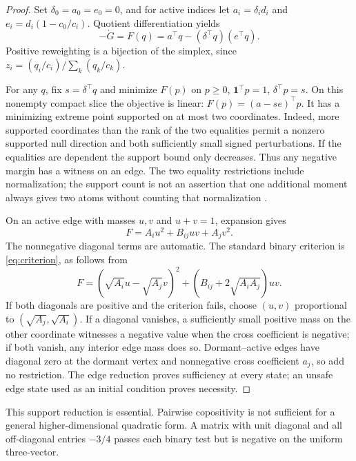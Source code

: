 \documentclass[pdflatex,sn-vancouver-num]{sn-jnl}
\theoremstyle{thmstyleone}
\begin{document}
\begin{proof}
Set $\delta_0=a_0=e_0=0$, and for active indices let
$a_i=\delta_i d_i$ and $e_i=d_i(1-c_0/c_i)$.
Quotient differentiation yields
\begin{equation}\label{eq:F}
-\dot G=F(q)=a^\top q-(\delta^\top q)(e^\top q).
\end{equation}
Positive reweighting is a bijection of the simplex, since
$z_i=(q_i/c_i)/\sum_k(q_k/c_k)$.

For any $q$, fix $s=\delta^\top q$ and minimize $F(p)$ on
$p\ge0$, $\mathbf1^\top p=1$, $\delta^\top p=s$.
On this nonempty compact slice the objective is linear:
$F(p)=(a-se)^\top p$.
It has a minimizing extreme point supported on at most two coordinates. Indeed, more supported coordinates than the rank of the two equalities permit a nonzero supported null direction and both sufficiently small signed perturbations. If the equalities are dependent the support bound only decreases. Thus any negative margin has a witness on an edge. The two equality restrictions include normalization; the support count is not an assertion that one additional moment always gives two atoms without counting that normalization \cite{moment,pinelis}.

On an active edge with masses $u,v$ and $u+v=1$, expansion gives
\begin{equation}\label{eq:binary}
F=A_i u^2+B_{ij}uv+A_jv^2.
\end{equation}
The nonnegative diagonal terms are automatic. The standard binary criterion is \eqref{eq:criterion}, as follows from
\[
F=(\sqrt{A_i}u-\sqrt{A_j}v)^2+
(B_{ij}+2\sqrt{A_iA_j})uv.
\]
If both diagonals are positive and the criterion fails, choose $(u,v)$ proportional to $(\sqrt{A_j},\sqrt{A_i})$. If a diagonal vanishes, a sufficiently small positive mass on the other coordinate witnesses a negative value when the cross coefficient is negative; if both vanish, any interior edge mass does so. Dormant--active edges have diagonal zero at the dormant vertex and nonnegative cross coefficient $a_j$, so add no restriction. The edge reduction proves sufficiency at every state; an unsafe edge state used as an initial condition proves necessity.
\end{proof}

This support reduction is essential. Pairwise copositivity is not sufficient for a general higher-dimensional quadratic form. A matrix with unit diagonal and all off-diagonal entries $-3/4$ passes each binary test but is negative on the uniform three-vector.
\end{document}
